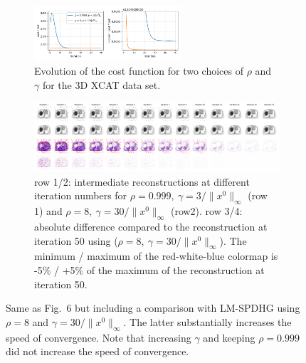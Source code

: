 \documentclass[10pt,twocolumn,twoside]{article}
\begin{document}
\begin{figure}
  \centering
  \begin{subfigure}[]{1.0\textwidth}
    \centering
    \includegraphics[width=0.6\textwidth]{./figureS3a_xcat_TV_3e-2_4e7_rho_8_conv_metrics.png}
    \caption{Evolution of the cost function for two choices of $\rho$ and $\gamma$ for the 3D
             XCAT data set.}
  \end{subfigure}
  \vfill
  \begin{subfigure}[]{1.0\textwidth}
    \centering
    \includegraphics[width=1.0\textwidth]{./figureS3b_xcat_TV_3e-2_4e7_rho_8_conv.png}
    \caption{row 1/2: intermediate reconstructions at different iteration numbers for
                      $\rho = 0.999, \ \gamma = 3/ \| x^0 \|_\infty$ (row 1) and
                      $\rho = 8, \ \gamma = 30/ \| x^0 \|_\infty$ (row2). 
             row 3/4: absolute difference compared to the reconstruction at iteration 50
                      using ($\rho = 8, \ \gamma = 30/ \| x^0 \|_\infty$).
                      The minimum / maximum of the red-white-blue colormap is -5\% / +5\%
                      of the maximum of the reconstruction at iteration 50.}
  \end{subfigure}
  \caption{Same as Fig.~6 but including a comparison with LM-SPDHG using $\rho = 8$ and 
           $\gamma = 30 / \| x^0 \|_\infty$. 
           The latter substantially increases the speed of convergence.
           Note that increasing $\gamma$ and keeping $\rho = 0.999$ did not increase the
           speed of convergence.}
\end{figure}
\end{document}
